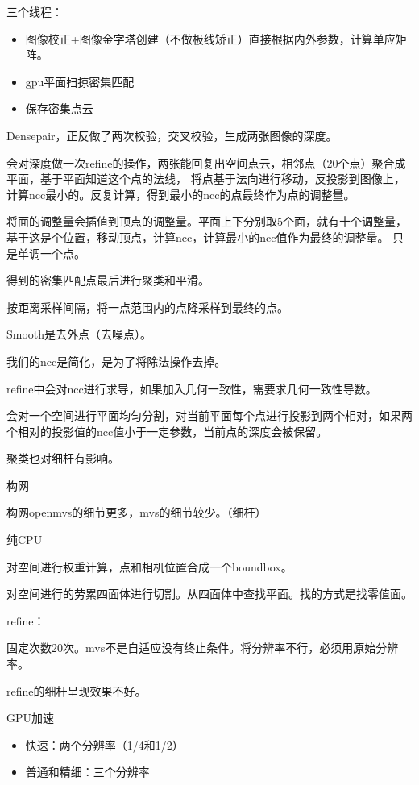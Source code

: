 三个线程：

\begin{itemize}
	\item 图像校正+图像金字塔创建（不做极线矫正）直接根据内外参数，计算单应矩阵。
	\item gpu平面扫掠密集匹配
	\item 保存密集点云
\end{itemize}

Densepair，正反做了两次校验，交叉校验，生成两张图像的深度。

会对深度做一次refine的操作，两张能回复出空间点云，相邻点（20个点）聚合成平面，基于平面知道这个点的法线，
将点基于法向进行移动，反投影到图像上，计算ncc最小的。反复计算，得到最小的ncc的点最终作为点的调整量。

将面的调整量会插值到顶点的调整量。平面上下分别取5个面，就有十个调整量，基于这是个位置，移动顶点，计算ncc，计算最小的ncc值作为最终的调整量。
只是单调一个点。

得到的密集匹配点最后进行聚类和平滑。

按距离采样间隔，将一点范围内的点降采样到最终的点。

Smooth是去外点（去噪点）。

我们的ncc是简化，是为了将除法操作去掉。


refine中会对ncc进行求导，如果加入几何一致性，需要求几何一致性导数。

会对一个空间进行平面均匀分割，对当前平面每个点进行投影到两个相对，如果两个相对的投影值的ncc值小于一定参数，当前点的深度会被保留。

聚类也对细杆有影响。


构网

构网openmvs的细节更多，mvs的细节较少。（细杆）

纯CPU

对空间进行权重计算，点和相机位置合成一个boundbox。

对空间进行的劳累四面体进行切割。从四面体中查找平面。找的方式是找零值面。


refine：

固定次数20次。mvs不是自适应没有终止条件。将分辨率不行，必须用原始分辨率。

refine的细杆呈现效果不好。

GPU加速

\begin{itemize}
	\item 快速：两个分辨率（1/4和1/2）
	\item 普通和精细：三个分辨率
\end{itemize}


